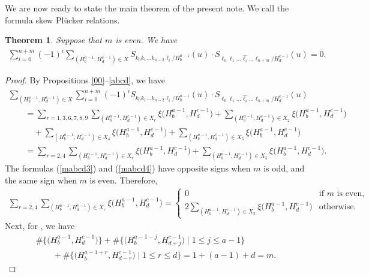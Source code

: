 \documentclass[pdftex]{sigma}
\numberwithin{equation}{section}
\newtheorem{Theorem}{Theorem}[section]
\begin{document}
We are now ready to state the main theorem of the present note. We call the formula skew Pl\"ucker relations.

\begin{Theorem}%
Suppose that $m$ is even. We have
\begin{gather*}
\sum_{i=0}^{n+m}{(-1)}^{i}\sum_{(H^{a-1}_{b},H^{c-1}_{d})\in X}S_{k_0 k_1 \dots k_{n-2} \ell_i/H^{a-1}_{b}}(u)\cdot S_{\ell_0 \ell_1 \dots \widehat{\ell_i} \dots \ell_{n+m}/H^{c-1}_{d}}(u)=0.
\end{gather*}
\end{Theorem}
\begin{proof}
By Propositions \ref{00}--\ref{abcd}, we have
\begin{gather*}
\sum_{(H^{a-1}_{b},H^{c-1}_{d})\in X}\sum_{i= 0}^{n+m}{(-1)}^{i}S_{k_0 k_1 \dots k_{n-2} \ell_i/H^{a-1}_{b}}(u)\cdot S_{\ell_0 \ell_1 \dots \widehat{\ell_i} \dots \ell_{n+m}/H^{c-1}_{d}}(u)\\
\qquad{}=\sum_{r=1,3,6,7,8,9}\sum_{(H^{a-1}_{b},H^{c-1}_{d})\in X_r}\xi\bigl(H^{a-1}_{b},H^{c-1}_{d}\bigr)+\sum_{(H^{a-1}_{b},H^{c-1}_{d})\in X_2}\xi\bigl(H^{a-1}_{b},H^{c-1}_{d}\bigr)\\
\qquad\quad{}+\sum_{(H^{a-1}_{b},H^{c-1}_{d})\in X_4}\xi\bigl(H^{a-1}_{b},H^{c-1}_{d}\bigr)+\sum_{(H^{a-1}_{b},H^{c-1}_{d})\in X_5}\xi\bigl(H^{a-1}_{b},H^{c-1}_{d}\bigr)\\
\qquad{}=\sum_{r=2,4}\sum_{(H^{a-1}_{b},H^{c-1}_{d})\in X_r}\xi\bigl(H^{a-1}_{b},H^{c-1}_{d}\bigr)+\sum_{(H^{a-1}_{b},H^{c-1}_{d})\in X_5}\xi\bigl(H^{a-1}_{b},H^{c-1}_{d}\bigr).
\end{gather*}
The formulas (\ref{mabcd3}) and (\ref{mabcd4}) have opposite signs when $m$ is odd, and the same sign when $m$ is even. Therefore,
\begin{gather*}
\sum_{r=2,4}\sum_{(H^{a-1}_{b},H^{c-1}_{d})\in X_r}\xi\bigl(H^{a-1}_{b},H^{c-1}_{d}\bigr)=
\begin{cases}
0 & \text{if $m$ is even},\\
\displaystyle 2\sum_{(H^{a-1}_{b},H^{c-1}_{d})\in X_2}\xi\bigl(H^{a-1}_{b},H^{c-1}_{d}\bigr) & \text{otherwise}.
\end{cases}
\end{gather*}
Next, for , we have
\begin{gather*}
\#\bigl\{\bigl(H^{a-1}_{b},H^{c-1}_{d}\bigr)\bigr\}+\#\bigl\{\bigl(H^{a-1-j}_{b},H^{c-1}_{d+j}\bigr)\mid 1\leq j\leq a-1 \bigr\}\\
\qquad{}+\#\bigl\{\bigl(H^{a-1+r}_{b},H^{c-1}_{d-r}\bigr)\mid 1\leq r\leq d \bigr\}=1+(a-1)+d=m.

\end{gather*}
\end{proof}
\end{document}
